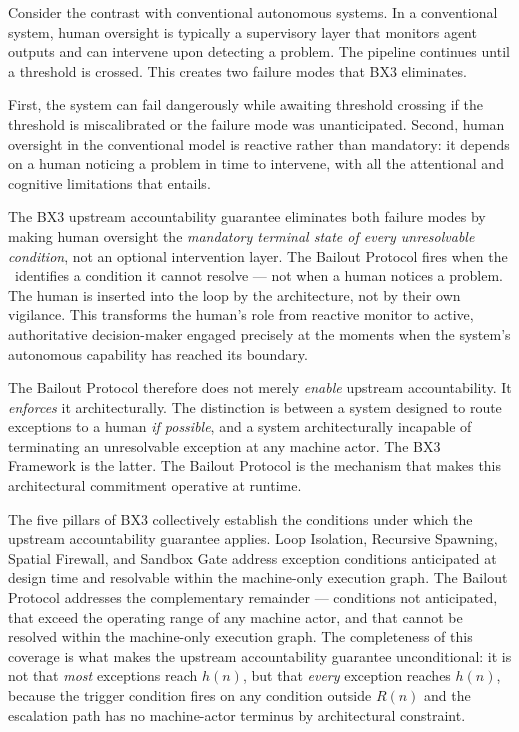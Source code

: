 Consider the contrast with conventional autonomous systems. In a conventional system, human oversight is typically a supervisory layer that monitors agent outputs and can intervene upon detecting a problem. The pipeline continues until a threshold is crossed. This creates two failure modes that BX3 eliminates.

First, the system can fail dangerously while awaiting threshold crossing if the threshold is miscalibrated or the failure mode was unanticipated. Second, human oversight in the conventional model is reactive rather than mandatory: it depends on a human noticing a problem in time to intervene, with all the attentional and cognitive limitations that entails.

The BX3 upstream accountability guarantee eliminates both failure modes by making human oversight the \textit{mandatory terminal state of every unresolvable condition}, not an optional intervention layer. The Bailout Protocol fires when the \bounds\ identifies a condition it cannot resolve --- not when a human notices a problem. The human is inserted into the loop by the architecture, not by their own vigilance. This transforms the human's role from reactive monitor to active, authoritative decision-maker engaged precisely at the moments when the system's autonomous capability has reached its boundary.

The Bailout Protocol therefore does not merely \textit{enable} upstream accountability. It \textit{enforces} it architecturally. The distinction is between a system designed to route exceptions to a human \textit{if possible}, and a system architecturally incapable of terminating an unresolvable exception at any machine actor. The BX3 Framework is the latter. The Bailout Protocol is the mechanism that makes this architectural commitment operative at runtime.

The five pillars of BX3 collectively establish the conditions under which the upstream accountability guarantee applies. Loop Isolation, Recursive Spawning, Spatial Firewall, and Sandbox Gate address exception conditions anticipated at design time and resolvable within the machine-only execution graph. The Bailout Protocol addresses the complementary remainder --- conditions not anticipated, that exceed the operating range of any machine actor, and that cannot be resolved within the machine-only execution graph. The completeness of this coverage is what makes the upstream accountability guarantee unconditional: it is not that \emph{most} exceptions reach $h(n)$, but that \emph{every} exception reaches $h(n)$, because the trigger condition fires on any condition outside $R(n)$ and the escalation path has no machine-actor terminus by architectural constraint.

